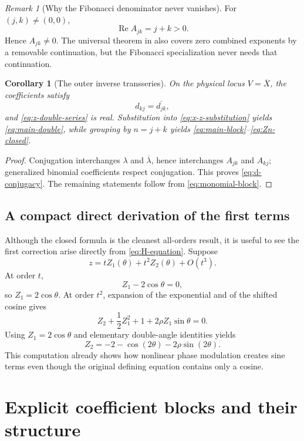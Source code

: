 \documentclass[11pt,oneside]{article}
\theoremstyle{plain}
\newtheorem{corollary}[theorem]{Corollary}
\theoremstyle{definition}
\theoremstyle{remark}
\newtheorem{remark}[theorem]{Remark}
\newcommand{\Real}{\operatorname{Re}}
\begin{document}
\begin{remark}[Why the Fibonacci denominator never vanishes]
For \((j,k)\ne(0,0)\),
\[
 \Real A_{jk}=j+k>0.
\]
Hence \(A_{jk}\ne0\).  The universal theorem in
 also covers zero combined exponents by a removable
continuation, but the Fibonacci specialization never needs that continuation.
\end{remark}

\begin{corollary}[The outer inverse transseries]
\label{cor:inverse-transseries}
On the physical locus \(V=\overline X\), the coefficients satisfy
\begin{equation}
 d_{kj}=\overline{d_{jk}},
 \label{eq:d-conjugacy}
\end{equation}
and \eqref{eq:z-double-series} is real.  Substitution into
\eqref{eq:x-z-substitution} yields \eqref{eq:main-double}, while grouping by
\(n=j+k\) yields \eqref{eq:main-block}--\eqref{eq:Zn-closed}.
\end{corollary}

\begin{proof}
Conjugation interchanges \(\lambda\) and \(\overline\lambda\), hence
interchanges \(A_{jk}\) and \(A_{kj}\); generalized binomial coefficients
respect conjugation.  This proves \eqref{eq:d-conjugacy}.  The remaining
statements follow from \eqref{eq:monomial-block}.
\end{proof}

\subsection{A compact direct derivation of the first terms}

Although the closed formula is the cleanest all-orders result, it is useful to
see the first correction arise directly from \eqref{eq:H-equation}.  Suppose
\[
 z=tZ_1(\theta)+t^2Z_2(\theta)+O(t^3).
\]
At order \(t\),
\[
 Z_1-2\cos\theta=0,
\]
so \(Z_1=2\cos\theta\).  At order \(t^2\), expansion of the exponential and
of the shifted cosine gives
\[
 Z_2+\frac12Z_1^2+1+2\rho Z_1\sin\theta=0.
\]
Using \(Z_1=2\cos\theta\) and elementary double-angle identities yields
\[
 Z_2=-2-\cos(2\theta)-2\rho\sin(2\theta).
\]
This computation already shows how nonlinear phase modulation creates sine
terms even though the original defining equation contains only a cosine.

\section{Explicit coefficient blocks and their structure}
\label{sec:blocks}
\end{document}
